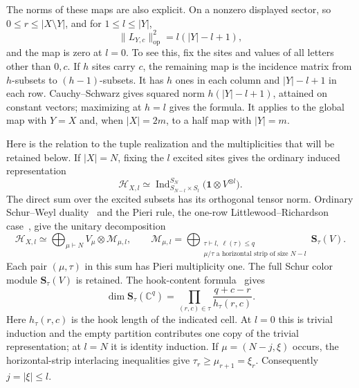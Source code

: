 The norms of these maps are also explicit.  On a nonzero displayed
sector, so $0\le r\le|X\setminus Y|$, and for $1\le l\le |Y|$,
\[
 \|L_{Y,c}\|_{\mathrm{op}}^2=l(|Y|-l+1),
\]
and the map is zero at $l=0$.  To see this, fix the sites and values
of all letters other than $0,c$.  If $h$ sites carry $c$, the remaining
map is the incidence matrix from $h$-subsets to $(h-1)$-subsets.  It
has $h$ ones in each column and $|Y|-l+1$ in each row.  Cauchy--Schwarz
gives squared norm $h(|Y|-l+1)$, attained on constant vectors;
maximizing at $h=l$ gives the formula.  It applies to the global map
with $Y=X$ and, when $|X|=2m$, to a half map with $|Y|=m$.

Here is the relation to the tuple realization and the multiplicities that
will be retained below.  If \(|X|=N\), fixing the \(l\) excited sites gives
the ordinary induced representation
\[
 \mathcal H_{X,l}\simeq
 \operatorname{Ind}_{S_{N-l}\times S_l}^{S_N}
       \bigl(\mathbf1\otimes V^{\otimes l}\bigr).
\]
The direct sum over the excited subsets has its orthogonal tensor norm.
Ordinary Schur--Weyl duality~\cite[Theorem~4.57 and Corollary~4.59]{etingof}
and the Pieri rule, the one-row Littlewood--Richardson case~\cite[\S2.10, equation~(2.10.1)]{SamSnowden2012}, give the unitary decomposition
\begin{equation}\label{s:lowering-full-multiplicities}
 \mathcal H_{X,l}\simeq
 \bigoplus_{\mu\vdash N}V_\mu\otimes\mathcal M_{\mu,l},
 \qquad
 \mathcal M_{\mu,l}=
 \bigoplus_{\substack{\tau\vdash l,\ \ell(\tau)\le q\\
                  \mu/\tau\text{ a horizontal strip of size }N-l}}
                  \mathbf S_\tau(V).
\end{equation}
Each pair \((\mu,\tau)\) in this sum has Pieri multiplicity one.  The full
Schur color module \(\mathbf S_\tau(V)\) is retained.  The hook-content
formula~\cite[\S3.6, equation~(3.6.1), and \S4.3]{SamSnowden2012} gives
\[
 \dim\mathbf S_\tau(\mathbb C^q)
   =\prod_{(r,c)\in\tau}\frac{q+c-r}{h_\tau(r,c)}.
\]
Here \(h_\tau(r,c)\) is the hook length of the indicated cell.
At \(l=0\) this is trivial induction and the empty partition contributes
one copy of the trivial representation; at \(l=N\) it is identity
induction.  If \(\mu=(N-j,\xi)\) occurs, the horizontal-strip
interlacing inequalities give \(\tau_r\ge\mu_{r+1}=\xi_r\).
Consequently \(j=|\xi|\le l\).

